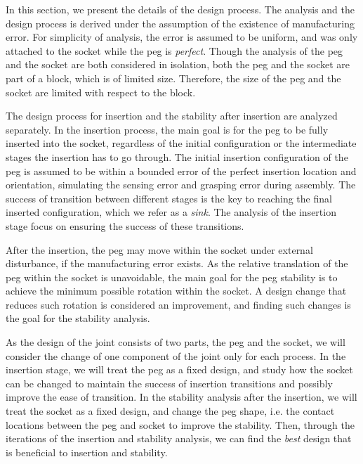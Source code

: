 \documentclass[11pt, twocolumn]{article}
\begin{document}
In this section, we present the details of the design process. The analysis and the design process is derived under the assumption of the existence of manufacturing error. For simplicity of analysis, the error is assumed to be uniform, and was only attached to the socket while the peg is {\em perfect}. Though the analysis of the peg and the socket are both considered in isolation, both the peg and the socket are part of a block, which is of limited size. Therefore, the size of the peg and the socket are limited with respect to the block. 

The design process for insertion and the stability after insertion are analyzed separately. In the insertion process, the main goal is for the peg to be fully inserted into the socket, regardless of the initial configuration or the intermediate stages the insertion has to go through. The initial insertion configuration of the peg is assumed to be within a bounded error of the perfect insertion location and orientation, simulating the sensing error and grasping error during assembly. The success of transition between different stages is the key to reaching the final inserted configuration, which we refer as a {\em sink}. The analysis of the insertion stage focus on ensuring the success of these transitions. 

After the insertion, the peg may move within the socket under external disturbance, if the manufacturing error exists. As the relative translation of the peg within the socket is unavoidable, the main goal for the peg stability is to achieve the minimum possible rotation within the socket. A design change that reduces such rotation is considered an improvement, and finding such changes is the goal for the stability analysis. 

As the design of the joint consists of two parts, the peg and the socket, we will consider the change of one component of the joint only for each process. In the insertion stage, we will treat the peg as a fixed design, and study how the socket can be changed to maintain the success of insertion transitions and possibly improve the ease of transition. In the stability analysis after the insertion, we will treat the socket as a fixed design, and change the peg shape, i.e. the contact locations between the peg and socket to improve the stability. Then, through the iterations of the insertion and stability analysis, we can find the {\em best} design that is beneficial to insertion and stability. 

\end{document}
